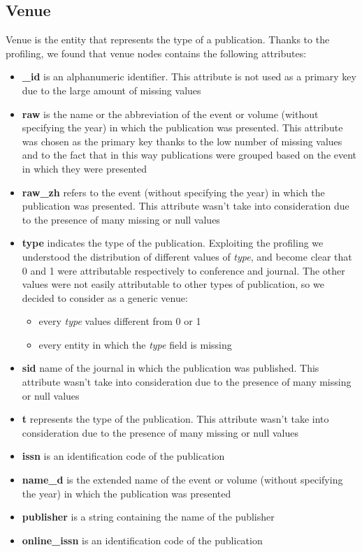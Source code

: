 \documentclass{Configuration_Files/PoliMi3i_thesis}
\begin{document}
\subsection{Venue}
Venue is the entity that represents the type of a publication. Thanks to the profiling, we found that venue nodes contains
the following attributes:
\begin{itemize}
    \item \textbf{\_id} is an alphanumeric identifier. This attribute is not used as a primary key due to the large amount
            of missing values
    \item \textbf{raw} is the name or the abbreviation of the event or volume (without specifying the year) in which the
            publication was presented. This attribute was chosen as the primary key thanks to the low number of missing
            values and to the fact that in this way publications were grouped based on the event in which they were presented
    \item \textbf{raw\_zh} refers to the event (without specifying the year) in which the publication was presented. 
            This attribute wasn't take into consideration due to the presence of many missing or null values
    \item \textbf{type} indicates the type of the publication. Exploiting the profiling we understood the distribution
            of different values of \emph{type}, and become clear that 0 and 1 were attributable respectively to conference
            and journal. The other values were not easily attributable to other types of publication, so we decided to consider
            as a generic venue:
            \begin{itemize}
                \item every \emph{type} values different from 0 or 1
                \item every entity in which the \emph{type} field is missing
            \end{itemize} 
    \item \textbf{sid} name of the journal in which the publication was published. This attribute wasn't take into
            consideration due to the presence of many missing or null values
    \item \textbf{t} represents the type of the publication. This attribute wasn't take into consideration due to the
            presence of many missing or null values
    \item \textbf{issn} is an identification code of the publication
    \item \textbf{name\_d} is the extended name of the event or volume (without specifying the year) in which the
            publication was presented
    \item \textbf{publisher} is a string containing the name of the publisher
    \item \textbf{online\_issn} is an identification code of the publication
\end{itemize}
\end{document}
